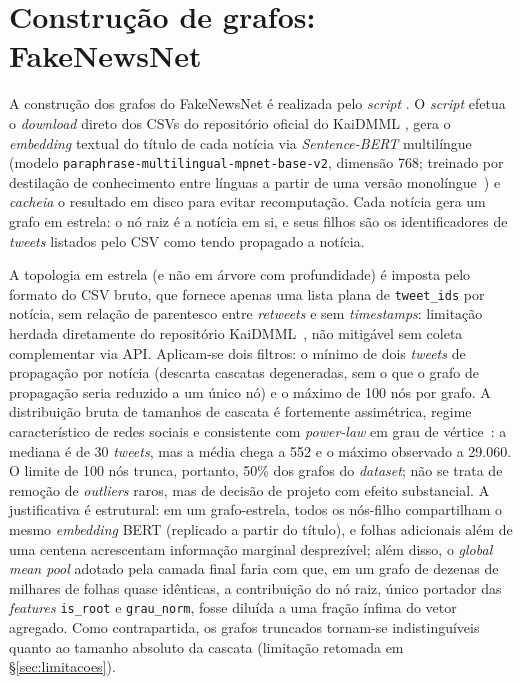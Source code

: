 \section{Constru\c{c}\~ao de grafos: FakeNewsNet}
\label{sec:construcao_fnn}

A constru\c{c}\~ao dos grafos do FakeNewsNet \'e realizada pelo \emph{script}
. O \emph{script} efetua o
\emph{download} direto dos CSVs do reposit\'orio oficial do KaiDMML
\cite{shu2020fakenewsnet}, gera o \emph{embedding} textual do t\'itulo de
cada not\'icia via \emph{Sentence-BERT} multil\'ingue (modelo
\texttt{paraphrase-multilingual-mpnet-base-v2}, dimens\~ao 768; treinado
por destila\c{c}\~ao de conhecimento entre l\'inguas a partir de uma
vers\~ao monol\'ingue~\cite{reimers2020multilingual}) e \emph{cacheia} o
resultado em disco para evitar recomputa\c{c}\~ao. Cada
not\'icia gera um grafo em estrela: o n\'o raiz \'e a not\'icia em si, e
seus filhos s\~ao os identificadores de \emph{tweets} listados pelo CSV
como tendo propagado a not\'icia.

A topologia em estrela (e n\~ao em \'arvore com profundidade) \'e
imposta pelo formato do CSV bruto, que fornece apenas uma lista plana de
\texttt{tweet\_ids} por not\'icia, sem rela\c{c}\~ao de parentesco entre
\emph{retweets} e sem \emph{timestamps}: limita\c{c}\~ao herdada
diretamente do reposit\'orio KaiDMML~\cite{shu2020fakenewsnet}, n\~ao
mitig\'avel sem coleta complementar via API. Aplicam-se dois filtros: o m\'inimo de dois
\emph{tweets} de propaga\c{c}\~ao por not\'icia (descarta cascatas
degeneradas, sem o que o grafo de propaga\c{c}\~ao seria reduzido a um
\'unico n\'o) e o m\'aximo de 100 n\'os por grafo. A distribui\c{c}\~ao
bruta de tamanhos de cascata \'e fortemente assim\'etrica, regime
caracter\'istico de redes sociais e consistente com \emph{power-law}
em grau de v\'ertice~\cite{barabasi1999emergence, clauset2009powerlaw}:
a mediana \'e de 30 \emph{tweets}, mas a m\'edia chega a 552 e o
m\'aximo observado a 29.060. O limite de 100 n\'os trunca, portanto,
50\% dos grafos do \emph{dataset}; n\~ao se trata de remo\c{c}\~ao de
\emph{outliers} raros, mas de decis\~ao de projeto com efeito
substancial. A justificativa \'e
estrutural: em um grafo-estrela, todos os n\'os-filho compartilham o mesmo
\emph{embedding} BERT (replicado a partir do t\'itulo), e folhas
adicionais al\'em de uma centena acrescentam informa\c{c}\~ao marginal
desprez\'ivel; al\'em disso, o \emph{global mean pool} adotado pela
camada final faria com que, em um grafo de dezenas de milhares de folhas
quase id\^enticas, a contribui\c{c}\~ao do n\'o raiz, \'unico portador
das \emph{features} \texttt{is\_root} e \texttt{grau\_norm}, fosse
dilu\'ida a uma fra\c{c}\~ao \'infima do vetor agregado. Como
contrapartida, os grafos truncados tornam-se indistingu\'iveis quanto ao
tamanho absoluto da cascata (limita\c{c}\~ao retomada em
\S\ref{sec:limitacoes}).

